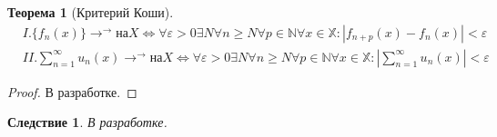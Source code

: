 \documentclass[12pt, oneside]{article}
\theoremstyle{plain}
\newtheorem{Theorem}{Теорема}
\newtheorem{Corollary}{Следствие}
\begin{document}
\begin{Theorem}[Критерий Коши] \
	\begin{equation} \nonumber
		\begin{split}
			& I. \{f_n(x)\} \to^{\to} \text{на} X \Leftrightarrow \forall \varepsilon > 0
			\exists N \forall n \geq N \forall p \in \mathbb{N} \forall x \in \mathbb{X}:
			\left|f_{n+p}(x) -f_n(x)\right| < \varepsilon \\
			& II. \sum_{n=1}^{\infty} u_n(x) \to^{\to} \text{на} X \Leftrightarrow \forall \varepsilon > 0
			\exists N \forall n \geq N \forall p \in \mathbb{N} \forall x \in \mathbb{X}:
			\left|\sum_{n=1}^{\infty} u_n(x) \right| < \varepsilon
		\end{split}
	\end{equation}
\end{Theorem}

\begin{proof}
	В разработке.
\end{proof}
\begin{Corollary}
	В разработке.
\end{Corollary}
\end{document}
